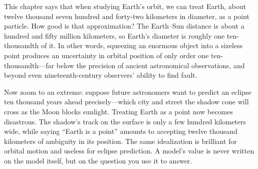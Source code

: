 \begin{thought}
This chapter says that when studying Earth's orbit, we can treat Earth, about twelve thousand seven hundred and forty-two kilometers in diameter, as a point particle. How good is that approximation? The Earth--Sun distance is about a hundred and fifty million kilometers, so Earth's diameter is roughly one ten-thousandth of it. In other words, squeezing an enormous object into a sizeless point produces an uncertainty in orbital position of only order one ten-thousandth---far below the precision of ancient astronomical observations, and beyond even nineteenth-century observers' ability to find fault.

\begin{center}
\end{center}

Now zoom to an extreme: suppose future astronomers want to predict an eclipse ten thousand years ahead precisely---which city and street the shadow cone will cross as the Moon blocks sunlight. Treating Earth as a point now becomes disastrous. The shadow's track on the surface is only a few hundred kilometers wide, while saying ``Earth is a point'' amounts to accepting twelve thousand kilometers of ambiguity in its position. The same idealization is brilliant for orbital motion and useless for eclipse prediction. A model's value is never written on the model itself, but on the question you use it to answer.
\end{thought}

